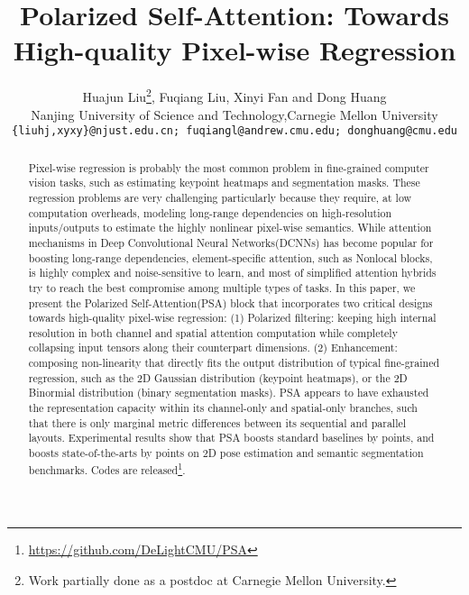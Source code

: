 \documentclass[10pt,twocolumn,letterpaper]{article}
\begin{document}
\title{Polarized Self-Attention: Towards High-quality Pixel-wise Regression}

\author{Huajun Liu\thanks{Work partially done as a postdoc at Carnegie Mellon University.}, Fuqiang Liu, Xinyi Fan and Dong Huang\\
{\small Nanjing University of Science and Technology,Carnegie Mellon University}\\
{\tt\small  \{liuhj,xyxy\}@njust.edu.cn; fuqiangl@andrew.cmu.edu; donghuang@cmu.edu} 
}

\maketitle
\ificcvfinal\thispagestyle{empty}\fi

\begin{abstract}
 Pixel-wise regression is probably the most common problem in fine-grained computer vision tasks, such as estimating keypoint heatmaps and segmentation masks. These regression problems are very challenging particularly because they require, at low computation overheads, modeling long-range dependencies on high-resolution inputs/outputs to estimate the highly nonlinear pixel-wise semantics. While attention mechanisms in Deep Convolutional Neural Networks(DCNNs) has become popular for boosting long-range dependencies, element-specific attention, such as Nonlocal blocks, is highly complex and noise-sensitive to learn, and most of simplified attention hybrids try to reach the best compromise among multiple types of tasks. In this paper, we present the Polarized Self-Attention(PSA) block that incorporates two critical designs towards high-quality pixel-wise regression: (1) Polarized filtering: keeping high internal resolution in both channel and spatial attention computation while completely collapsing input tensors along their counterpart dimensions. (2) Enhancement: composing non-linearity that directly fits the output distribution of typical fine-grained regression, such as the 2D Gaussian distribution (keypoint heatmaps), or the 2D Binormial distribution (binary segmentation masks). PSA appears to have exhausted the representation capacity within its channel-only and spatial-only branches, such that there is only marginal metric differences between its sequential and parallel layouts. Experimental results show that PSA boosts standard baselines by  points, and boosts state-of-the-arts by  points on 2D pose estimation and semantic segmentation benchmarks. Codes are released\footnote{\url{https://github.com/DeLightCMU/PSA}}.
\end{abstract}
\end{document}
